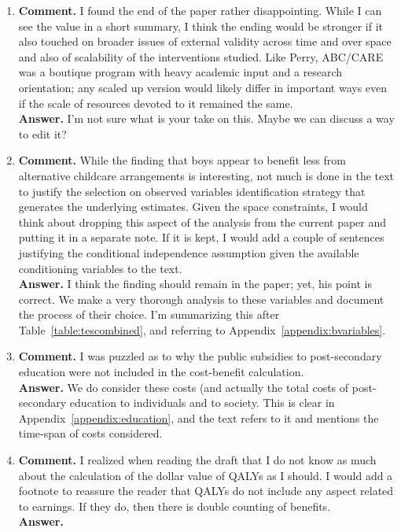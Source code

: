 \begin{enumerate}
\item
\noindent \textbf{Comment.} I found the end of the paper rather disappointing. While I can see the value in a short summary, I think the ending would be stronger if it also touched on broader issues of external validity across time and over space and also of scalability of the interventions studied. Like Perry, ABC/CARE was a boutique program with heavy academic input and a research orientation; any scaled up version would likely differ in important ways even if the scale of resources devoted to it remained the same.\\ 

\noindent \textbf{Answer.} I'm not sure what is your take on this. Maybe we can discuss a way to edit it?\\

\item
\noindent \textbf{Comment.} While the finding that boys appear to benefit less from alternative childcare arrangements is interesting, not much is done in the text to justify the selection on observed variables identification strategy that generates the underlying estimates. Given the space constraints, I would think about dropping this aspect of the analysis from the current paper and putting it in a separate note. If it is kept, I would add a couple of sentences justifying the conditional independence assumption given the available conditioning variables to the text.\\ 

\noindent \textbf{Answer.} I think the finding should remain in the paper; yet, his point is correct. We make a very thorough analysis to these variables and document the process of their choice. I'm summarizing this after Table~\ref{table:tescombined}, and referring to Appendix~\ref{appendix:bvariables}.\\

\item
\noindent \textbf{Comment.} I was puzzled as to why the public subsidies to post-secondary education were not included in the cost-benefit calculation.\\

\noindent \textbf{Answer.} We do consider these costs (and actually the total costs of post-secondary education to individuals and to society. This is clear in Appendix~\ref{appendix:education}, and the text refers to it and mentions the time-span of costs considered.

\item 
\noindent \textbf{Comment.} I realized when reading the draft that I do not know as much about the calculation of the dollar value of QALYs as I should. I would add a footnote to reassure the reader that QALYs do not include any aspect related to earnings. If they do, then there is double counting of benefits.\\
\noindent \textbf{Answer.}\\


\end{enumerate}
